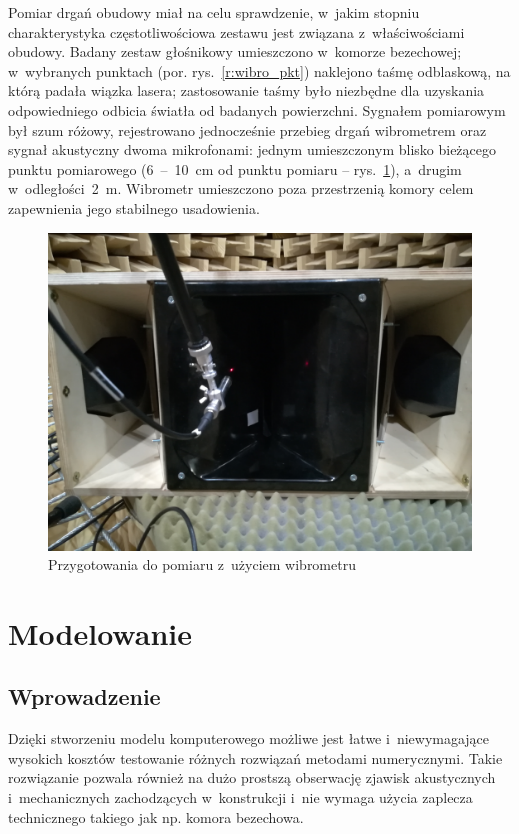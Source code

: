 \documentclass[12pt]{oska}
\newcommand{\range}[2]{\num{#1}~--~\num{#2}}
\begin{document}
	Pomiar drgań obudowy miał na celu sprawdzenie, w~jakim stopniu charakterystyka częstotliwościowa zestawu jest związana z~właściwościami obudowy. Badany zestaw głośnikowy umieszczono w~komorze bezechowej; w~wybranych punktach (por. rys.~\ref{r:wibro_pkt}) naklejono taśmę odblaskową, na którą padała wiązka lasera; zastosowanie taśmy było niezbędne dla uzyskania odpowiedniego odbicia światła od badanych powierzchni. %
	Sygnałem pomiarowym był szum różowy, rejestrowano jednocześnie przebieg drgań wibrometrem oraz sygnał akustyczny dwoma mikrofonami: jednym umieszczonym blisko bieżącego punktu pomiarowego (\range{6}{10}~\si{\cm} od punktu pomiaru -- rys.~\ref{r:wibro_zdjecie}), a~drugim w~odległości~\SI{2}{\metre}. Wibrometr umieszczono poza przestrzenią komory celem zapewnienia jego stabilnego usadowienia.
	
	\begin{figure}[!ht]
		\centering
		\includegraphics[width=.7\textwidth]{zdjecie_wibro.jpg}
		\caption{Przygotowania do pomiaru z~użyciem wibrometru}
		\label{r:wibro_zdjecie}
	\end{figure}
	
	
	\section{Modelowanie}
	
	\subsection{Wprowadzenie}
	
	Dzięki stworzeniu modelu komputerowego możliwe jest łatwe i~niewymagające wysokich kosztów testowanie różnych rozwiązań metodami numerycznymi. Takie rozwiązanie pozwala również na dużo prostszą obserwację zjawisk akustycznych i~mechanicznych zachodzących w~konstrukcji i~nie wymaga użycia zaplecza technicznego takiego jak np. komora bezechowa. 
	
\end{document}
